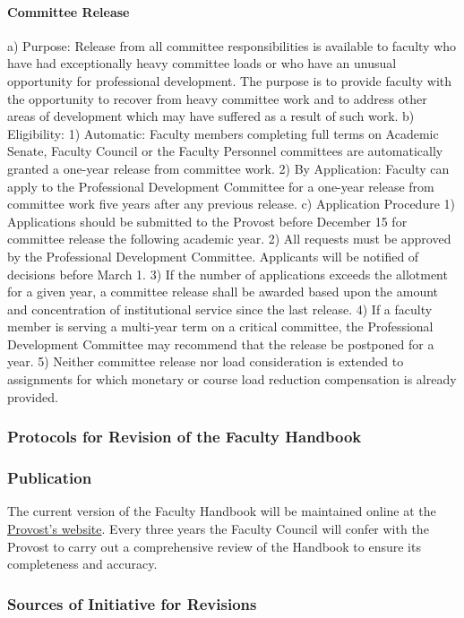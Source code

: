 \documentclass[letterpaper, 11pt]{article}
\begin{document}
			\paragraph{Committee Release}
				a) Purpose:  Release from all committee responsibilities is available to faculty who have had exceptionally heavy committee loads or who have an unusual opportunity for professional development.  The purpose is to provide faculty with the opportunity to recover from heavy committee work and to address other areas of development which may have suffered as a result of such work.
				b) Eligibility:
				1) Automatic:  Faculty members completing full terms on Academic Senate, Faculty Council or the Faculty Personnel committees are automatically granted a one-year release from committee work.
				2) By Application:  Faculty can apply to the Professional Development Committee for a one-year release from committee work five years after any previous release.
				c) Application Procedure
				1) Applications should be submitted to the Provost before December 15 for committee release the following academic year.
				2) All requests must be approved by the Professional Development Committee.  Applicants will be notified of decisions before March 1.
				3) If the number of applications exceeds the allotment for a given year, a committee release shall be awarded based upon the amount and concentration of institutional service since the last release.
				4) If a faculty member is serving a multi-year term on a critical committee, the Professional Development Committee may recommend that the release be postponed for a year.
				5) Neither committee release nor load consideration is extended to assignments for which monetary or course load reduction compensation is already provided.

		\subsubsection{Protocols for Revision of the Faculty Handbook}
		\subsubsection{Publication}
			The current version of the Faculty Handbook will be maintained online at the \href{http://www.westmont.edu/_offices/provost/documents/Faculty-Handbook.pdf}{Provost's website}.  Every three years the Faculty Council will confer with the Provost to carry out a comprehensive review of the Handbook to ensure its completeness and accuracy.
		\subsubsection{Sources of Initiative for Revisions}
\end{document}

